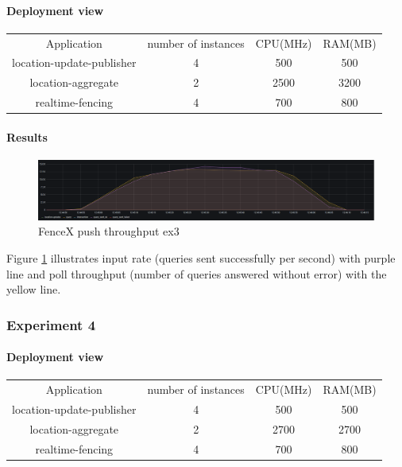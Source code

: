 \documentclass[a4]{report}
\begin{document}
        \paragraph{Deployment view}
        \begin{center}
            \begin{tabular}{ c c c c }
                Application               & number of instances & CPU(MHz) & RAM(MB) \\
                location-update-publisher & 4                   & 500      & 500     \\
                location-aggregate        & 2                   & 2500     & 3200    \\
                realtime-fencing          & 4                   & 700      & 800     \\
            \end{tabular}
        \end{center}

        \paragraph{Results}
        \begin{figure}[ht]
            \caption{FenceX push throughput ex3}
            \label{fig:ex3}
            \includegraphics[scale=0.4]{images/evaluation/ex3-benchmarking(16,9).png}
        \end{figure}

        Figure \ref{fig:ex3} illustrates input rate (queries sent successfully per second) with purple line and poll
        throughput (number of queries answered without error) with the yellow line.

        \subsubsection{Experiment 4}

        \paragraph{Deployment view}
        \begin{center}
            \begin{tabular}{ c c c c }
                Application               & number of instances & CPU(MHz) & RAM(MB) \\
                location-update-publisher & 4                   & 500      & 500     \\
                location-aggregate        & 2                   & 2700     & 2700    \\
                realtime-fencing          & 4                   & 700      & 800     \\
            \end{tabular}
        \end{center}
\end{document}
